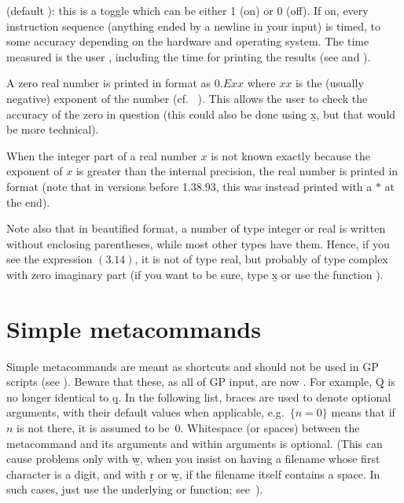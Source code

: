  (default ): this is a toggle which can be either 1
(on) or 0 (off). If on, every instruction sequence (anything ended by a
newline in your input) is timed, to some accuracy depending on the hardware
and operating system. The time measured is the user ,
 including the time for printing the results (see \kbd{\#} and
\kbd{\#\#}).


\noindent
A zero real number is printed in  format as $0.Exx$ where $xx$ is
the (usually negative)  exponent of the number (cf.\ %
). This allows the user to check the accuracy of the zero
in question (this could also be done using \b{x}, but that would be more
technical).

When the integer part of a real number $x$ is not known exactly because the
exponent of $x$ is greater than the internal precision, the real number is
printed in  format (note that in versions before 1.38.93, this was
instead printed with a $*$ at the end).

Note also that in beautified format, a number of type integer or real is
written without enclosing parentheses, while most other types have them.
Hence, if you see the expression $( 3.14 )$, it is not of type real, but
probably of type complex with zero imaginary part (if you want to be sure, type
\b{x} or use the function ).

\section{Simple metacommands}\label{se:meta}

\noindent
Simple metacommands are meant as shortcuts and should not be used in GP
scripts (see ). Beware that these, as all of GP input,
are now . For example, \b{Q} is no longer identical to
\b{q}. In the following list, braces are used to denote optional arguments,
with their default values when applicable, e.g.~$\{n=0\}$ means that if $n$
is not there, it is assumed to be~$0$. Whitespace (or spaces) between the
metacommand and its arguments and within arguments is optional. (This can
cause problems only with \b{w}, when you insist on having a filename whose
first character is a digit, and with \b{r} or \b{w}, if the filename itself
contains a space. In such cases, just use the underlying  or
 function; see~).

